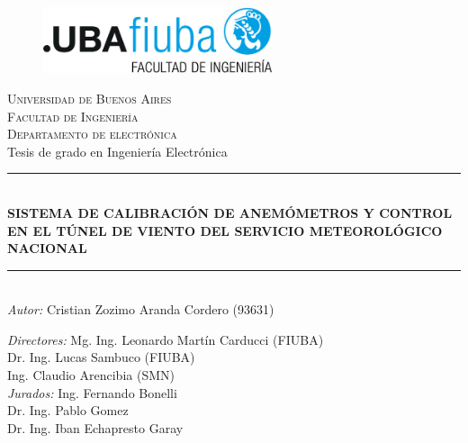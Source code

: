 \begin{titlepage}
\newcommand{\HRule}{\rule{\linewidth}{0.5mm}} 
\center 
\begin{figure}[H]
\centering
\includegraphics[width=0.6\textwidth]{fiuba_logo.jpg}
\end{figure}
\textsc{\large Universidad de Buenos Aires}\\[0.1cm] 
\textsc{\large Facultad de Ingeniería}\\[0.1cm]
\textsc{\large Departamento de electrónica}\\[1cm]

{\LARGE Tesis de grado en Ingeniería Electrónica} \\[0.1cm]

\HRule \\[0.1cm]
{\LARGE \bfseries SISTEMA DE CALIBRACIÓN DE ANEMÓMETROS Y CONTROL EN EL TÚNEL DE VIENTO DEL SERVICIO METEOROLÓGICO NACIONAL}\\
\HRule \\[0.1cm]

\Large \emph{Autor:} \Large Cristian Zozimo Aranda Cordero (93631) \\[0.1cm]
\begin{flushleft}
\Large \emph{Directores:} \hspace{0.5em} \Large Mg. Ing. Leonardo Martín Carducci (FIUBA) \\[0.1cm]
\hspace{6em}\Large  Dr. Ing. Lucas Sambuco (FIUBA) \\
\hspace{6em}\Large  Ing. Claudio Arencibia (SMN)\\[0.5cm]
\Large \emph{Jurados:} \hspace{1.6em} \Large Ing. Fernando Bonelli\\
\hspace{6em}\Large Dr. Ing. Pablo Gomez  \\
\hspace{6em}\Large Dr. Ing. Iban Echapresto Garay \\[1cm] 
\end{flushleft}
\vfill 
\end{titlepage}
